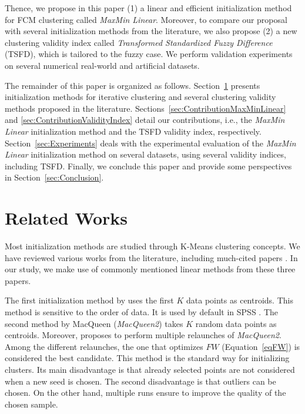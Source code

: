 \documentclass[runningheads,a4paper]{llncs}
\begin{document}
Thence, we propose in this paper (1) a linear and efficient initialization method for FCM clustering called \textit{MaxMin Linear}. Moreover, to compare our proposal with several initialization methods from the literature, we also propose (2) a new clustering validity index called \textit{Transformed Standardized Fuzzy Difference} (TSFD), which is tailored to the fuzzy case. We perform validation experiments on several numerical real-world and artificial datasets. 

The remainder of this paper is organized as follows. Section~\ref{sec:RelatedWorks} presents initialization methods for iterative clustering and several clustering validity methods proposed in the literature. Sections~\ref{sec:ContributionMaxMinLinear} and \ref{sec:ContributionValidityIndex} detail our contributions, i.e., the \textit{MaxMin Linear} initialization method and the TSFD validity index, respectively. Section~\ref{sec:Experiments} deals with the experimental evaluation of the \textit{MaxMin Linear} initialization method on several datasets, using several validity indices, including TSFD. Finally, we conclude this paper and provide some perspectives in Section~\ref{sec:Conclusion}. 


\section{Related Works}
\label{sec:RelatedWorks}

Most initialization methods are studied through K-Means clustering \cite{macqueen1967some} concepts. We have reviewed various works from the literature, including much-cited papers \cite{steinley2007initializing,maitra2011systematic,celebi2013comparative}. In our study, we make use of commonly mentioned linear methods from these three papers. 

The first initialization method by \cite{macqueen1967some} uses the first $K$ data points as centroids. This method is sensitive to the order of data. It is used by default in SPSS \cite{noruvsis2012ibm}. The second method by MacQueen (\textit{MacQueen2}) takes $K$ random data points as centroids. Moreover, \cite{faber1994clustering} proposes to perform multiple relaunches of \textit{MacQueen2}. Among the different relaunches, the one that optimizes $FW$ (Equation~\ref{eqFW}) is considered the best candidate. This method is the standard way for initializing clusters. Its main disadvantage is that already selected points are not considered when a new seed is chosen. The second disadvantage is that outliers can be chosen. On the other hand, multiple runs ensure to improve the quality of the chosen sample. 
\end{document}
